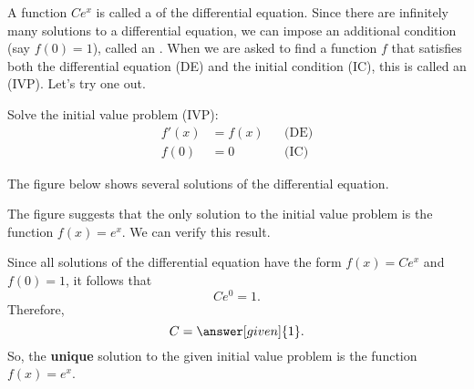 \documentclass{ximera}
\begin{document}
A function $Ce^x$ is called a  of the differential equation. Since there are infinitely many solutions to a differential equation, we can impose an additional condition (say $f(0)=1$), called an . When we are asked to find a function $f$ that satisfies both the differential equation (DE) and the initial condition (IC), this is called an  (IVP). Let's try one out.
\begin{example}
Solve the initial value problem (IVP):
\begin{align*}
	f'(x) & = f(x) && \text{(DE)}  \\
	f(0) & = 0 && \text{(IC)} 
\end{align*}
\begin{explanation}
The figure below shows several solutions of the differential equation. 
\begin{image}
\end{image}
The figure suggests that the only solution to the initial value problem is the function $f(x)=e^x$.
We can verify this result.

Since all solutions of the differential equation have the form $f(x)=Ce^x$ and $f(0)=1$, it follows that 
\[
Ce^0 = 1.
\]
Therefore,
\[
C = \answer[given]{1}.
\]
So, the \textbf{unique} solution to the given initial value problem is the function $f(x)=e^x$.
\end{explanation}
\end{example}
\end{document}
